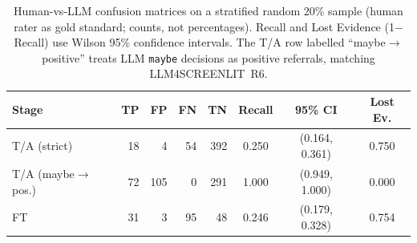 \begin{table}[htbp]
\centering
\caption{Human-vs-LLM confusion matrices on a stratified random 20\% sample (human rater as gold standard; counts, not percentages). Recall and Lost Evidence (1$-$Recall) use Wilson 95\% confidence intervals. The T/A row labelled ``maybe$\rightarrow$positive'' treats LLM \texttt{maybe} decisions as positive referrals, matching LLM4SCREENLIT~R6.}
\label{tab:human-confusion}
\small
\setlength{\tabcolsep}{3pt}
\begin{tabular}{l rrrr c c c}
\toprule
Stage & TP & FP & FN & TN & Recall & 95\% CI & Lost Ev. \\
\midrule
T/A (strict) & 18 & 4 & 54 & 392 & 0.250 & (0.164, 0.361) & 0.750 \\
T/A (maybe$\rightarrow$pos.) & 72 & 105 & 0 & 291 & 1.000 & (0.949, 1.000) & 0.000 \\
FT & 31 & 3 & 95 & 48 & 0.246 & (0.179, 0.328) & 0.754 \\
\bottomrule
\end{tabular}
\end{table}